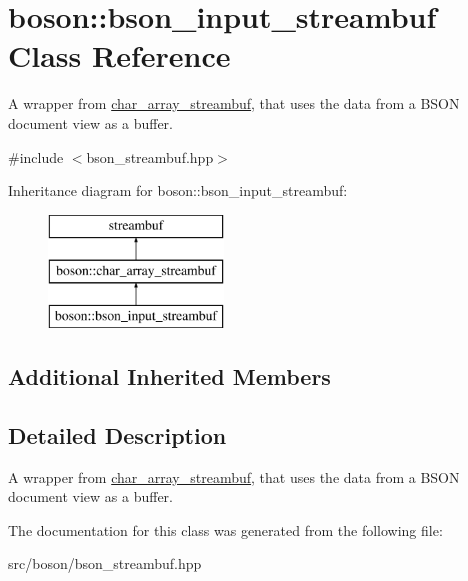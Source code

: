 \hypertarget{classboson_1_1bson__input__streambuf}{}\section{boson\+:\+:bson\+\_\+input\+\_\+streambuf Class Reference}
\label{classboson_1_1bson__input__streambuf}


A wrapper from \hyperlink{classboson_1_1char__array__streambuf}{char\+\_\+array\+\_\+streambuf}, that uses the data from a B\+S\+ON document view as a buffer.  




{\ttfamily \#include $<$bson\+\_\+streambuf.\+hpp$>$}

Inheritance diagram for boson\+:\+:bson\+\_\+input\+\_\+streambuf\+:\begin{figure}[H]
\begin{center}
\leavevmode
\includegraphics[height=3.000000cm]{classboson_1_1bson__input__streambuf}
\end{center}
\end{figure}
\subsection*{Additional Inherited Members}


\subsection{Detailed Description}
A wrapper from \hyperlink{classboson_1_1char__array__streambuf}{char\+\_\+array\+\_\+streambuf}, that uses the data from a B\+S\+ON document view as a buffer. 

The documentation for this class was generated from the following file\+:\begin{DoxyCompactItemize}
\item 
src/boson/bson\+\_\+streambuf.\+hpp\end{DoxyCompactItemize}
